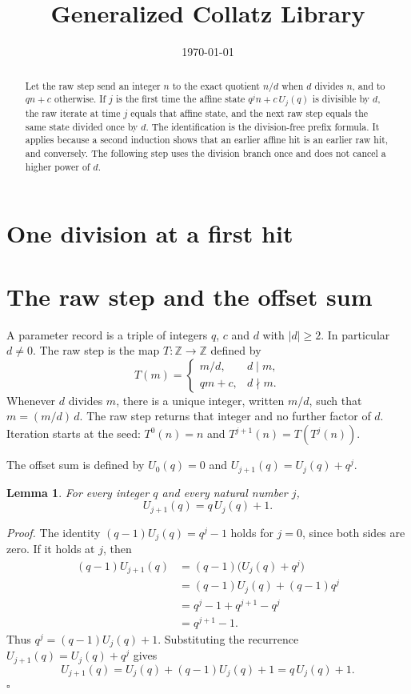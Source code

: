 \documentclass[11pt,letterpaper]{article}
\title{Generalized Collatz Library}
\author{}
\date{\today}
\newcommand{\Z}{\mathbb{Z}}
\newcommand{\Map}[3]{#1 \colon #2 \to #3}
\newtheorem{lemma}[theorem]{Lemma}
\newenvironment{proof}{\noindent\textit{Proof.}}{\hfill\(\square\)}
\begin{document}
\maketitle
\section*{One division at a first hit}

\begin{abstract}
Let the raw step send an integer \(n\) to the exact quotient \(n/d\) when \(d\) divides \(n\), and to \(qn+c\) otherwise. If \(j\) is the first time the affine state \(q^{j}n+c\,U_{j}(q)\) is divisible by \(d\), the raw iterate at time \(j\) equals that affine state, and the next raw step equals the same state divided once by \(d\). The identification is the division-free prefix formula. It applies because a second induction shows that an earlier affine hit is an earlier raw hit, and conversely. The following step uses the division branch once and does not cancel a higher power of \(d\).
\end{abstract}

\section{The raw step and the offset sum}

A parameter record is a triple of integers \(q\), \(c\) and \(d\) with \(|d|\ge 2\). In particular \(d\neq 0\). The raw step is the map \(\Map{T}{\Z}{\Z}\) defined by
\[
T(m)=\begin{cases}
m/d, & d\mid m,\\
qm+c, & d\nmid m.
\end{cases}
\]
Whenever \(d\) divides \(m\), there is a unique integer, written \(m/d\), such that \(m=(m/d)\,d\). The raw step returns that integer and no further factor of \(d\). Iteration starts at the seed: \(T^{0}(n)=n\) and \(T^{j+1}(n)=T(T^{j}(n))\).

The offset sum is defined by \(U_{0}(q)=0\) and \(U_{j+1}(q)=U_{j}(q)+q^{j}\).

\begin{lemma}\label{Lem:OffsetRecursion}
For every integer \(q\) and every natural number \(j\),
\[
U_{j+1}(q)=q\,U_{j}(q)+1.
\]
\end{lemma}

\begin{proof}
The identity \((q-1)U_{j}(q)=q^{j}-1\) holds for \(j=0\), since both sides are zero. If it holds at \(j\), then
\begin{align*}
(q-1)U_{j+1}(q)
&= (q-1)\bigl(U_{j}(q)+q^{j}\bigr) \\
&= (q-1)U_{j}(q)+(q-1)q^{j} \\
&= q^{j}-1+q^{j+1}-q^{j} \\
&= q^{j+1}-1.
\end{align*}
Thus \(q^{j}=(q-1)U_{j}(q)+1\). Substituting the recurrence \(U_{j+1}(q)=U_{j}(q)+q^{j}\) gives
\[
U_{j+1}(q)=U_{j}(q)+(q-1)U_{j}(q)+1=q\,U_{j}(q)+1.
\]
\end{proof}
\end{document}
